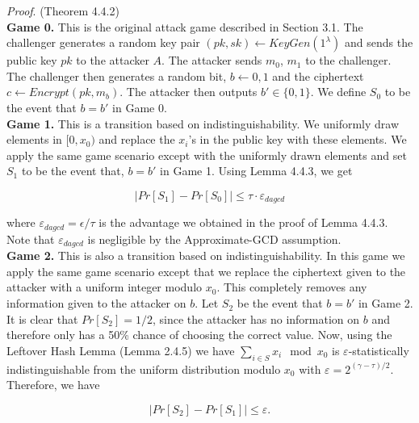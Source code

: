 \documentclass[../../main.tex]{subfiles}
\begin{document}
\noindent\textit{Proof}. (Theorem 4.4.2)\\

\noindent\textbf{Game 0.} This is the original attack game described in Section 3.1. The challenger generates a random key pair $(pk,sk) \leftarrow KeyGen(1^\lambda)$ and sends the public key $pk$ to the attacker $A$. The attacker sends $m_0$, $m_1$ to the challenger. The challenger then generates a random bit, $b \leftarrow {0,1}$ and the ciphertext $c \leftarrow Encrypt(pk,m_b)$. The attacker then outputs $b' \in \{0,1\}$. We define $S_0$ to be the event that $b=b'$ in Game 0.\\

\noindent\textbf{Game 1.} This is a transition based on indistinguishability. We uniformly draw elements in $[0,x_0)$ and replace the $x_i$'s in the public key with these elements. We apply the same game scenario except with the uniformly drawn elements and set $S_1$ to be the event that, $b=b'$ in Game 1. Using Lemma 4.4.3, we get

\begin{equation}
    |Pr[S_1]-Pr[S_0]| \leq \tau \cdot \varepsilon_{dagcd}
\end{equation}

\noindent where $\varepsilon_{dagcd} = \epsilon / \tau$ is the advantage we obtained in the proof of Lemma 4.4.3. Note that  $\varepsilon_{dagcd}$ is negligible by the Approximate-GCD assumption.\\

\noindent\textbf{Game 2.} This is also a transition based on indistinguishability. In this game we apply the same game scenario except that we replace the ciphertext given to the attacker with a uniform integer modulo $x_0$. This completely removes any information given to the attacker on $b$. Let $S_2$ be the event that $b=b'$ in Game 2. It is clear that $Pr[S_2]=1/2$, since the attacker has no information on $b$ and therefore only has a 50\% chance of choosing the correct value. Now, using the Leftover Hash Lemma (Lemma 2.4.5) we have $\sum\nolimits_{i \in S} x_i \mod x_0$ is $\varepsilon$-statistically indistinguishable from the uniform distribution modulo $x_0$ with $\varepsilon = 2^{(\gamma - \tau)/2}$. \\

\noindent Therefore, we have

\begin{equation}
    |Pr[S_2]-Pr[S_1]| \leq \varepsilon.
\end{equation}
\end{document}
